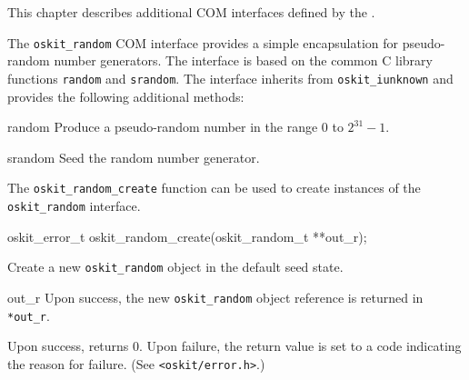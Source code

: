 %
% 
%
\label{intf-misc}

This chapter describes additional COM interfaces defined by the \oskit{}.


The \texttt{oskit_random} COM interface provides a simple encapsulation for
pseudo-random number generators.  The interface is based on the common C
library functions \texttt{random} and \texttt{srandom}.  The interface inherits
from \texttt{oskit_iunknown} and provides the following additional methods:
\begin{csymlist}
	\item[random]
		Produce a pseudo-random number in the range $0$ to $2^{31}-1$.
	\item[srandom]
		Seed the random number generator.
\end{csymlist}
The \texttt{oskit_random_create} function can be used to create instances of
the \texttt{oskit_random} interface.

\begin{apisyn}

	\funcproto oskit_error_t
	oskit_random_create(\outparam oskit_random_t **out_r);
\end{apisyn}
\begin{apidesc}
	Create a new \texttt{oskit_random} object in the default seed state.
\end{apidesc}
\begin{apiparm}
	\item[out_r]
		Upon success, the new \texttt{oskit_random} object reference is
		returned in \texttt{*out_r}.
\end{apiparm}
\begin{apiret}
	Upon success, returns 0.  Upon failure, the return value is set to a
	code indicating the reason for failure.  (See {\tt <oskit/error.h>}.)
\end{apiret}

